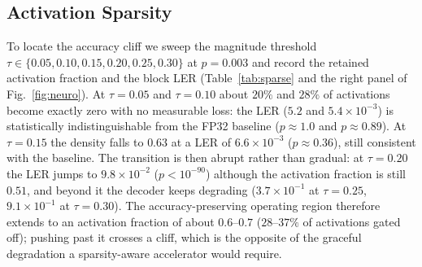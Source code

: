 ﻿\documentclass[conference]{IEEEtran}
\begin{document}
\subsection{Activation Sparsity}
To locate the accuracy cliff we sweep the magnitude threshold
$\tau\in\{0.05,0.10,0.15,0.20,0.25,0.30\}$ at $p{=}0.003$ and record the
retained activation fraction and the block LER (Table~\ref{tab:sparse} and
the right panel of Fig.~\ref{fig:neuro}). At $\tau{=}0.05$ and
$\tau{=}0.10$ about $20\%$ and $28\%$ of activations become exactly zero
with no measurable loss: the LER ($5.2$ and $5.4\times10^{-3}$) is
statistically indistinguishable from the FP32 baseline ($p{\approx}1.0$ and
$p{\approx}0.89$). At $\tau{=}0.15$ the density falls to $0.63$ at a LER of
$6.6\times10^{-3}$ ($p{\approx}0.36$), still consistent with the baseline.
The transition is then abrupt rather than gradual: at $\tau{=}0.20$ the LER
jumps to $9.8\times10^{-2}$ ($p{<}10^{-90}$) although the activation
fraction is still $0.51$, and beyond it the decoder keeps degrading
($3.7\times10^{-1}$ at $\tau{=}0.25$, $9.1\times10^{-1}$ at
$\tau{=}0.30$). The accuracy-preserving operating region therefore extends
to an activation fraction of about $0.6$--$0.7$ ($28$--$37\%$ of
activations gated off); pushing past it crosses a cliff, which is the
opposite of the graceful degradation a sparsity-aware accelerator would
require.
\begin{table}[t]
\caption{Activation-sparsity sweep at $p{=}0.003$ (5000 shots). $\tau$ is
the magnitude threshold, ``act.\ frac.'' the retained non-zero fraction,
and the final column the Wilson $95\%$ CI of the LER.}
\label{tab:sparse}
\centering
\footnotesize
{}
\end{table}
\end{document}
